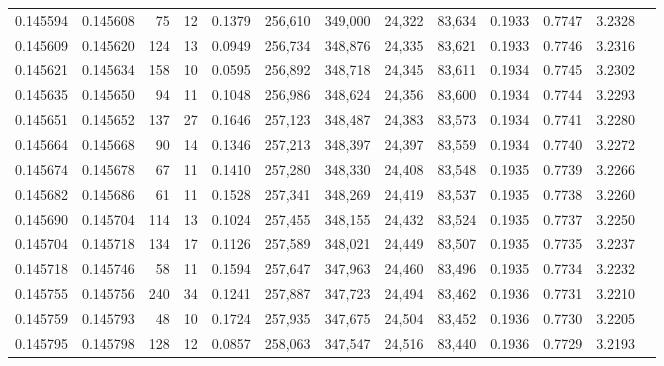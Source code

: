 \begin{tabular}{rrrrrrrrrrrrr}
0.145594 & 0.145608 &    75 &  12 &                                     0.1379 & 256,610 & 349,000 &  24,322 &  83,634 & 0.1933 & 0.7747 & 3.2328 \\
0.145609 & 0.145620 &   124 &  13 &                                     0.0949 & 256,734 & 348,876 &  24,335 &  83,621 & 0.1933 & 0.7746 & 3.2316 \\
0.145621 & 0.145634 &   158 &  10 &                                     0.0595 & 256,892 & 348,718 &  24,345 &  83,611 & 0.1934 & 0.7745 & 3.2302 \\
0.145635 & 0.145650 &    94 &  11 &                                     0.1048 & 256,986 & 348,624 &  24,356 &  83,600 & 0.1934 & 0.7744 & 3.2293 \\
0.145651 & 0.145652 &   137 &  27 &                                     0.1646 & 257,123 & 348,487 &  24,383 &  83,573 & 0.1934 & 0.7741 & 3.2280 \\
0.145664 & 0.145668 &    90 &  14 &                                     0.1346 & 257,213 & 348,397 &  24,397 &  83,559 & 0.1934 & 0.7740 & 3.2272 \\
0.145674 & 0.145678 &    67 &  11 &                                     0.1410 & 257,280 & 348,330 &  24,408 &  83,548 & 0.1935 & 0.7739 & 3.2266 \\
0.145682 & 0.145686 &    61 &  11 &                                     0.1528 & 257,341 & 348,269 &  24,419 &  83,537 & 0.1935 & 0.7738 & 3.2260 \\
0.145690 & 0.145704 &   114 &  13 &                                     0.1024 & 257,455 & 348,155 &  24,432 &  83,524 & 0.1935 & 0.7737 & 3.2250 \\
0.145704 & 0.145718 &   134 &  17 &                                     0.1126 & 257,589 & 348,021 &  24,449 &  83,507 & 0.1935 & 0.7735 & 3.2237 \\
0.145718 & 0.145746 &    58 &  11 &                                     0.1594 & 257,647 & 347,963 &  24,460 &  83,496 & 0.1935 & 0.7734 & 3.2232 \\
0.145755 & 0.145756 &   240 &  34 &                                     0.1241 & 257,887 & 347,723 &  24,494 &  83,462 & 0.1936 & 0.7731 & 3.2210 \\
0.145759 & 0.145793 &    48 &  10 &                                     0.1724 & 257,935 & 347,675 &  24,504 &  83,452 & 0.1936 & 0.7730 & 3.2205 \\
0.145795 & 0.145798 &   128 &  12 &                                     0.0857 & 258,063 & 347,547 &  24,516 &  83,440 & 0.1936 & 0.7729 & 3.2193 \\

\end{tabular}
